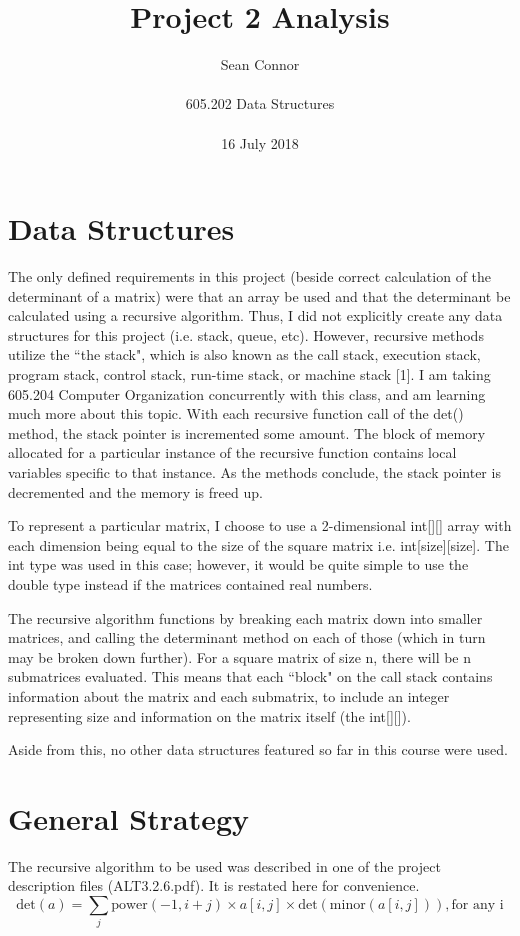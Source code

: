 \documentclass[12pt, titlepage]{article}
\title{Project 2 Analysis}
\author{Sean Connor \\ \\ 605.202 Data Structures \\ \\ 16 July 2018}
\date{}
\begin{document}
\maketitle

\section {Data Structures}

 The only defined requirements in this project (beside correct calculation of the determinant of a matrix) were that an array be used and that the determinant be calculated using a recursive algorithm. Thus, I did not explicitly create any data structures for this project (i.e. stack, queue, etc). However, recursive methods utilize the ``the stack", which is also known as the call stack, execution stack, program stack, control stack, run-time stack, or machine stack [1].  I am taking 605.204 Computer Organization concurrently with this class, and am learning much more about this topic. With each recursive function call of the det() method, the stack pointer is incremented some amount. The block of memory allocated for a particular instance of the recursive function contains local variables specific to that instance. As the methods conclude, the stack pointer is decremented and the memory is freed up.

To represent a particular matrix, I choose to use a 2-dimensional int[][] array with each dimension being equal to the size of the square matrix i.e. int[size][size]. The int type was used in this case; however, it would be quite simple to use the double type instead if the matrices contained real numbers.

The recursive algorithm functions by breaking each matrix down into smaller matrices, and calling the determinant method on each of those (which in turn may be broken down further). For a square matrix of size n, there will be n submatrices evaluated. This means that each ``block" on the call stack contains information about the matrix and each submatrix, to include an integer representing size and information on the matrix itself (the int[][]). 

Aside from this, no other data structures featured so far in this course were used.

\section{General Strategy}

The recursive algorithm to be used was described in one of the project description files (ALT3.2.6.pdf). It is restated here for convenience.
\begin{equation}
\textrm{det}(a) = \sum_j \textrm{power}(-1, i+j) \times a[i,j] \times \textrm{det}(\textrm{minor}(a[i,j])), \textrm{for any i}
\end{equation}
\end{document}
